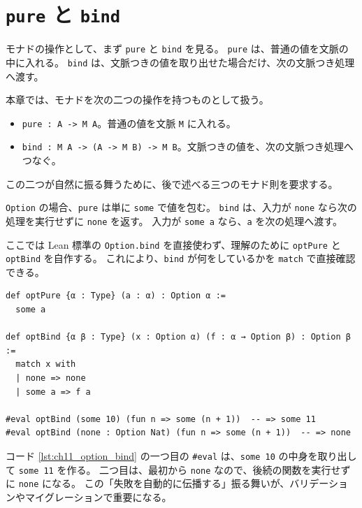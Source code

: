 \section{\texttt{pure} と \texttt{bind}}

モナドの操作として、まず \texttt{pure} と \texttt{bind} を見る。
\texttt{pure} は、普通の値を文脈の中に入れる。
\texttt{bind} は、文脈つきの値を取り出せた場合だけ、次の文脈つき処理へ渡す。

\begin{definitionbox}
本章では、モナドを次の二つの操作を持つものとして扱う。
\begin{itemize}
\item \texttt{pure : A -> M A}。普通の値を文脈 \texttt{M} に入れる。
\item \texttt{bind : M A -> (A -> M B) -> M B}。文脈つきの値を、次の文脈つき処理へつなぐ。
\end{itemize}
この二つが自然に振る舞うために、後で述べる三つのモナド則を要求する。
\end{definitionbox}

\texttt{Option} の場合、\texttt{pure} は単に \texttt{some} で値を包む。
\texttt{bind} は、入力が \texttt{none} なら次の処理を実行せずに \texttt{none} を返す。
入力が \texttt{some a} なら、\texttt{a} を次の処理へ渡す。

\begin{leanbox}
ここでは Lean 標準の \texttt{Option.bind} を直接使わず、理解のために \texttt{optPure} と \texttt{optBind} を自作する。
これにより、\texttt{bind} が何をしているかを \texttt{match} で直接確認できる。
\end{leanbox}

\begin{listing}[htbp]
\begin{verbatim}
def optPure {α : Type} (a : α) : Option α :=
  some a

def optBind {α β : Type} (x : Option α) (f : α → Option β) : Option β :=
  match x with
  | none => none
  | some a => f a

#eval optBind (some 10) (fun n => some (n + 1))  -- => some 11
#eval optBind (none : Option Nat) (fun n => some (n + 1))  -- => none
\end{verbatim}
\caption{Option 用の pure と bind}
\label{lst:ch11_option_bind}
\end{listing}

コード \ref{lst:ch11_option_bind} の一つ目の \texttt{\#eval} は、\texttt{some 10} の中身を取り出して \texttt{some 11} を作る。
二つ目は、最初から \texttt{none} なので、後続の関数を実行せずに \texttt{none} になる。
この「失敗を自動的に伝播する」振る舞いが、バリデーションやマイグレーションで重要になる。

